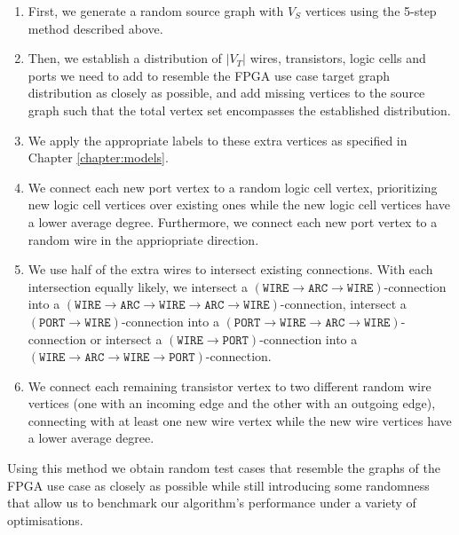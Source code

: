 \begin{enumerate}
\item First, we generate a random source graph with $V_S$ vertices using the 5-step method described above.
\item Then, we establish a distribution of $|V_T|$ wires, transistors, logic cells and ports we need to add to resemble the FPGA use case target graph distribution as closely as possible, and add missing vertices to the source graph such that the total vertex set encompasses the established distribution.
\item We apply the appropriate labels to these extra vertices as specified in Chapter \ref{chapter:models}.
\item We connect each new port vertex to a random logic cell vertex, prioritizing new logic cell vertices over existing ones while the new logic cell vertices have a lower average degree. Furthermore, we connect each new port vertex to a random wire in the appriopriate direction.
\item We use half of the extra wires to intersect existing connections. With each intersection equally likely, we intersect a $(\mathtt{WIRE} \to \mathtt{ARC} \to \mathtt{WIRE})$-connection into a $(\mathtt{WIRE} \to \mathtt{ARC} \to \mathtt{WIRE} \to \mathtt{ARC} \to \mathtt{WIRE})$-connection, intersect a $(\mathtt{PORT} \to \mathtt{WIRE})$-connection into a $(\mathtt{PORT} \to \mathtt{WIRE} \to \mathtt{ARC} \to \mathtt{WIRE})$-connection or intersect a  $(\mathtt{WIRE} \to \mathtt{PORT})$-connection into a $(\mathtt{WIRE} \to \mathtt{ARC} \to \mathtt{WIRE} \to \mathtt{PORT})$-connection.
\item We connect each remaining transistor vertex to two different random wire vertices (one with an incoming edge and the other with an outgoing edge), connecting with at least one new wire vertex while the new wire vertices have a lower average degree.
\end{enumerate}




Using this method we obtain random test cases that resemble the graphs of the FPGA use case as closely as possible while still introducing some randomness that allow us to benchmark our algorithm's performance under a variety of optimisations.

